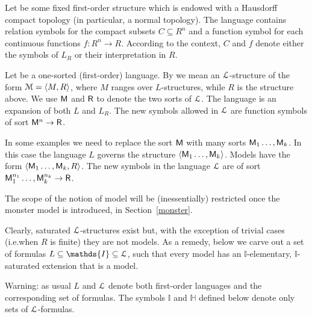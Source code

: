 \documentclass[11pt,oneside]{amsart}
\renewcommand*{\emph}[1]{%
   \smash{\tikz[baseline]\node[rectangle, fill=teal!25, rounded corners, inner xsep=0.5ex, inner ysep=0.2ex, anchor=base, minimum height = 2.7ex]{#1};}}
\begin{document}
Let \emph{$R$\/} be some fixed first-order structure which is endowed with a Hausdorff compact topology (in particular, a normal topology).
The language \emph{$L_{\!R}$\/} contains relation symbols for the compact subsets $C\subseteq R^n$ and a function symbol for each continuous functions $f:R^n\to R$.
According to the context, $C$ and $f$ denote either the symbols of $L_{\!R}$ or their interpretation in $R$.


\begin{definition}\label{def_0}
  Let \emph{$L$\/} be a one-sorted (first-order) language.
  By \emph{model\/} we mean an ${\EuScript L}$-structure of the form ${\EuScript M}=\langle  M,R\rangle$, where $M$ ranges over $L$-structures, while $R$ is the structure above.
  We use ${\sf M}$ and ${\sf R}$ to denote the two sorts of ${\EuScript L}$.
  The language \emph{${\EuScript L}$\/} is an expansion of both $L$ and $L_{\!R}$.
  The new symbols allowed in ${\EuScript L}$ are function symbols of sort ${\sf M}^n\to {\sf R}$. 
\end{definition}

In some examples we need to replace the sort ${\sf M}$ with many sorts ${\sf M}_1\dots,{\sf M}_k$.
In this case the language $L$ governs the structure $\langle{\sf M}_1\dots,{\sf M}_k\rangle$.
Models have the form $\langle{\sf M}_1\dots,{\sf M}_k, R\rangle$.
The new symbols in the language ${\EuScript L}$ are of sort ${\sf M}_1^{n_1}\dots,{\sf M}_k^{n_k}\to {\sf R}$.

The scope of the notion of model will be (inessentially) restricted once the monster model is introduced, in Section~\ref{monster}.

Clearly, saturated ${\EuScript L}$-structures exist but, with the exception of trivial cases (i.e.\@ when $R$ is finite) they are not models.
As a remedy, below we carve out a set of formulas $L\subseteq\mathds{I}\subseteq {\EuScript L}$, such that every model has an $\mathds{I}$-elementary, $\mathds{I}$-saturated extension that is a model.

Warning: as usual $L$ and ${\EuScript L}$ denote both first-order languages and the corresponding set of formulas.
The symbols $\mathds{I}$ and $\mathds{H}$ defined below denote only sets of ${\EuScript L}$-formulas.
\end{document}
